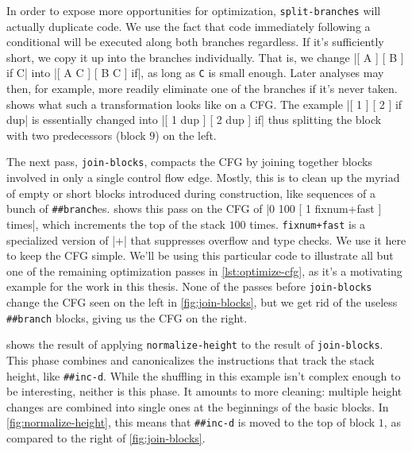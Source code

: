 
In order to expose more opportunities for optimization, \Verb|split-branches|
will actually duplicate code.  We use the fact that code immediately following
a conditional will be executed along both branches regardless.  If it's
sufficiently short, we copy it up into the branches individually.  That is, we
change
%
\factor|[ A ] [ B ] if C|
%
into
%
\factor|[ A C ] [ B C ] if|,
%
as long as \Verb|C| is small enough.  Later analyses may then, for example,
more readily eliminate one of the branches if it's never taken.
 shows what such a transformation looks like on a
\gls{CFG}.  The example
%
\factor|[ 1 ] [ 2 ] if dup|
%
is essentially changed into
%
\factor|[ 1 dup ] [ 2 dup ] if|
%
thus splitting the block with two predecessors (block $9$) on the left.


The next pass, \Verb|join-blocks|, compacts the \gls{CFG} by joining together
blocks involved in only a single control flow edge.  Mostly, this is to clean
up the myriad of empty or short blocks introduced during construction, like
sequences of a bunch of \Verb|##branch|es.   shows this
pass on the \gls{CFG} of
%
\factor|0 100 [ 1 fixnum+fast ] times|,
%
which increments the top of the stack $100$ times.  \Verb|fixnum+fast| is a
specialized version of \factor|+| that suppresses overflow and type checks.  We
use it here to keep the \gls{CFG} simple.  We'll be using this particular code
to illustrate all but one of the remaining optimization passes in
\vref{lst:optimize-cfg}, as it's a motivating example for the work in this
thesis.  None of the passes before \Verb|join-blocks|  change the \gls{CFG}
seen on the left in \vref{fig:join-blocks}, but we get rid of the useless
\Verb|##branch| blocks, giving us the \gls{CFG} on the right.


 shows the result of applying
\Verb|normalize-height| to the result of \Verb|join-blocks|.  This phase
combines and canonicalizes the instructions that track the stack height, like
\Verb|##inc-d|.  While the shuffling in this example isn't complex enough to be
interesting, neither is this phase.  It amounts to more cleaning: multiple
height changes are combined into single ones at the beginnings of the basic
blocks.  In \vref{fig:normalize-height}, this means that \Verb|##inc-d| is
moved to the top of block $1$, as compared to the right of
\vref{fig:join-blocks}.


